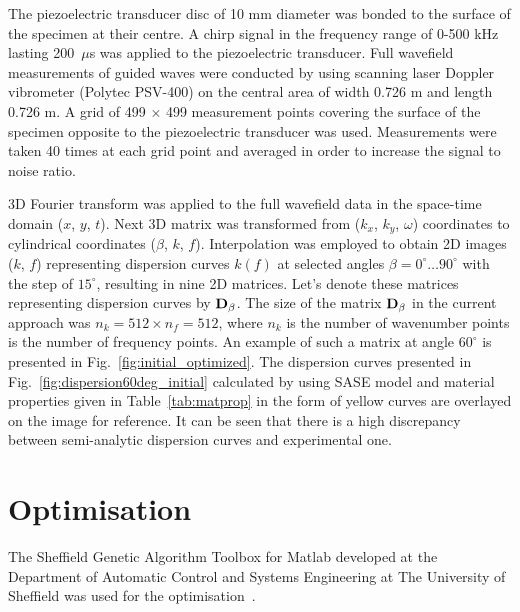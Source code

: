 The piezoelectric transducer disc of 10 mm diameter  was bonded to the surface of the 
specimen at their centre. A chirp signal in the frequency range of 0-500 kHz lasting 
200~\(\mu\)s was applied to the piezoelectric transducer.  Full wavefield measurements of guided waves were conducted by using 
scanning laser Doppler vibrometer (Polytec PSV-400) on the central area of width 
0.726 m and length 0.726 m. A grid of 499 \(\times\) 499 measurement points covering 
the surface of the specimen opposite to the piezoelectric transducer was used. 
 Measurements were taken 40 times at each grid point and averaged in 
order to increase the signal to noise ratio.

3D Fourier transform was applied to the full wavefield data in the space-time domain 
(\(x\), \(y\), \(t\)). Next 3D matrix was transformed from (\(k_x\), \(k_y\), \(\omega\)) 
coordinates to cylindrical coordinates (\(\beta\), \(k\), \(f\)). Interpolation was employed 
to 
obtain 2D images (\(k\), \(f\)) representing dispersion curves \(k(f)\) at selected angles 
\(\beta=0^{\circ}\ldots90^{\circ}\) with the step of \(15^{\circ}\), resulting in nine 2D 
matrices. Let's denote these matrices representing dispersion curves by 
\(\mathbf{D}_{\beta}\). The size of the matrix  \(\mathbf{D}_{\beta}\) in the current approach 
was \(n_k=512\times n_f=512\), where \(n_k\) is the number of wavenumber points 
 is the number of frequency points.  An example of such a matrix at angle \(
60^{\circ}\) is presented in Fig.~\ref{fig:initial_optimized}. The dispersion curves 
presented in Fig.~\ref{fig:dispersion60deg_initial} calculated by using SASE model and 
material properties given in Table~\ref{tab:matprop} in the form of yellow curves are 
overlayed on the image for reference. It can be seen that there is a high discrepancy 
between semi-analytic dispersion curves and experimental one. 


	
\section{Optimisation \label{sec:optimization}}
	
	The Sheffield Genetic Algorithm Toolbox for Matlab developed at the Department of Automatic Control and Systems Engineering at The University of Sheffield was used for the optimisation~\cite{Chipperfield1994}.
	
